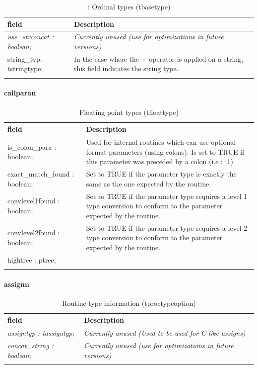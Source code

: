 \documentclass [12pt]{article}
\begin{document}
\begin{longtable}{|l|p{10cm}|}
\hline
field	& Description \\
\hline
\endhead
\hline
\endfoot
\textsf{\textit{use{\_}strconcat : boolean;}}& 
\textit{Currently unused (use for optimizations in future versions)} \\
\hline
\textsf{string{\_}typ: tstringtype;}& 
In the case where the + operator is applied on a string, this field indicates the string type. \\
\hline
\caption{: Ordinal types (tbasetype)}
\label{tab9}
\end{longtable}

\paragraph{callparan}\mbox{}

\begin{longtable}{|l|p{10cm}|}
\hline
field	& Description \\
\hline
\endhead
\hline
\endfoot
\textsf{is{\_}colon{\_}para : boolean;}& 
Used for internal routines which can use optional format parameters (using colons). Is set to TRUE if this parameter was preceded by a colon (i.e : :1) \\
\textsf{exact{\_}match{\_}found : boolean;}& 
Set to TRUE if the parameter type is exactly the same as the one expected by the routine. \\
\textsf{convlevel1found : boolean;}& 
Set to TRUE if the parameter type requires a level 1 type conversion to conform to the parameter expected by the routine. \\
\textsf{convlevel2found : boolean;}& 
Set to TRUE if the parameter type requires a level 2 type conversion to conform to the parameter expected by the routine. \\
\textsf{hightree : ptree;}&  \\
\hline
\caption{Floating point types (tfloattype)}
\label{tab10}
\end{longtable}

\paragraph{assignn}\mbox{}

\begin{longtable}{|l|p{10cm}|}
\hline
field	& Description \\
\hline
\endhead
\hline
\endfoot
\textsf{\textit{assigntyp : tassigntyp;}}& 
\textit{Currently unused (Used to be used for C-like assigns)} \\
\textsf{\textit{concat{\_}string : boolean;}}& 
\textit{Currently unused (use for optimizations in future versions)}\\
\hline
\caption{Routine type information (tproctypeoption)}
\end{longtable}
\end{document}
